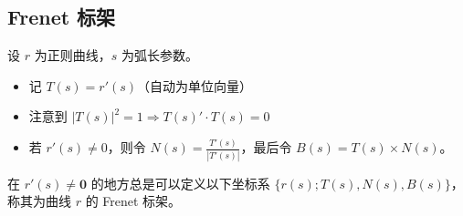 \documentclass[lang=cn,10pt,thmcnt=section]{elegantbook}
\renewcommand{\vec}[1]{\mathbf{#1}}
\begin{document}
\subsection{Frenet 标架}
\begin{definition}[Frenet 标架]
    设 $r$ 为正则曲线，$s$ 为弧长参数。
    \begin{itemize}
        \item 记 $T(s) = r'(s)$（自动为单位向量）
        \item 注意到 $|T(s)|^2 = 1 \Rightarrow T(s)' \cdot T(s) = 0$
        \item 若 $r'(s) \neq 0$，则令 $N(s) = \frac{T'(s)}{|T'(s)|}$，最后令 $B(s) = T(s) \times N(s)$。
    \end{itemize}
    在 $r'(s) \neq \vec{0}$ 的地方总是可以定义以下坐标系 $\{r(s); T(s), N(s), B(s)\}$，称其为曲线 $r$ 的 Frenet 标架。
\end{definition}
\end{document}
